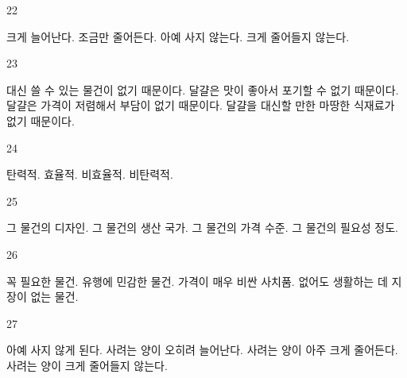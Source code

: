 \documentclass[fs9,seriesFre]{korfarm-base}
\begin{document}
\begin{kfSentenceUnit}{22}{}
\begin{kfChoices}
\kfChoice 크게 늘어난다.
\kfChoice 조금만 줄어든다.
\kfChoice 아예 사지 않는다.
\kfChoice 크게 줄어들지 않는다.
\end{kfChoices}
\end{kfSentenceUnit}

\begin{kfSentenceUnit}{23}{}
\begin{kfChoices}
\kfChoice 대신 쓸 수 있는 물건이 없기 때문이다.
\kfChoice 달걀은 맛이 좋아서 포기할 수 없기 때문이다.
\kfChoice 달걀은 가격이 저렴해서 부담이 없기 때문이다.
\kfChoice 달걀을 대신할 만한 마땅한 식재료가 없기 때문이다.
\end{kfChoices}
\end{kfSentenceUnit}

\begin{kfSentenceUnit}{24}{}
\begin{kfChoices}
\kfChoice 탄력적.
\kfChoice 효율적.
\kfChoice 비효율적.
\kfChoice 비탄력적.
\end{kfChoices}
\end{kfSentenceUnit}

\begin{kfSentenceUnit}{25}{}
\begin{kfChoices}
\kfChoice 그 물건의 디자인.
\kfChoice 그 물건의 생산 국가.
\kfChoice 그 물건의 가격 수준.
\kfChoice 그 물건의 필요성 정도.
\end{kfChoices}
\end{kfSentenceUnit}

\begin{kfSentenceUnit}{26}{}
\begin{kfChoices}
\kfChoice 꼭 필요한 물건.
\kfChoice 유행에 민감한 물건.
\kfChoice 가격이 매우 비싼 사치품.
\kfChoice 없어도 생활하는 데 지장이 없는 물건.
\end{kfChoices}
\end{kfSentenceUnit}

\begin{kfSentenceUnit}{27}{}
\begin{kfChoices}
\kfChoice 아예 사지 않게 된다.
\kfChoice 사려는 양이 오히려 늘어난다.
\kfChoice 사려는 양이 아주 크게 줄어든다.
\kfChoice 사려는 양이 크게 줄어들지 않는다.
\end{kfChoices}
\end{kfSentenceUnit}
\end{document}
